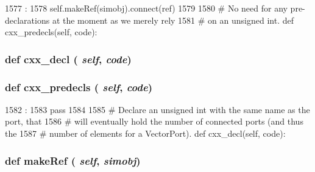 \begin{DoxyCode}
1577                                   :
1578         self.makeRef(simobj).connect(ref)
1579 
1580     # No need for any pre-declarations at the moment as we merely rely
1581     # on an unsigned int.
    def cxx_predecls(self, code):
\end{DoxyCode}
\hypertarget{classm5_1_1params_1_1Port_a723cbb1dc9ae0e7f3d102c6678f181c0}{
\subsubsection[{cxx\_\-decl}]{\setlength{\rightskip}{0pt plus 5cm}def cxx\_\-decl ( {\em self}, \/   {\em code})}}
\label{classm5_1_1params_1_1Port_a723cbb1dc9ae0e7f3d102c6678f181c0}



\hypertarget{classm5_1_1params_1_1Port_a0b408a11a14bd1d770e28f71a6e14ab5}{
\subsubsection[{cxx\_\-predecls}]{\setlength{\rightskip}{0pt plus 5cm}def cxx\_\-predecls ( {\em self}, \/   {\em code})}}
\label{classm5_1_1params_1_1Port_a0b408a11a14bd1d770e28f71a6e14ab5}



\begin{DoxyCode}
1582                                 :
1583         pass
1584 
1585     # Declare an unsigned int with the same name as the port, that
1586     # will eventually hold the number of connected ports (and thus the
1587     # number of elements for a VectorPort).
    def cxx_decl(self, code):
\end{DoxyCode}
\hypertarget{classm5_1_1params_1_1Port_a0170489846d992db3fea03df9156216b}{
\subsubsection[{makeRef}]{\setlength{\rightskip}{0pt plus 5cm}def makeRef ( {\em self}, \/   {\em simobj})}}
\label{classm5_1_1params_1_1Port_a0170489846d992db3fea03df9156216b}



